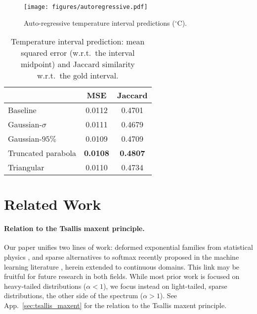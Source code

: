 \documentclass{article}
\begin{document}
{\begin{figure}[h]\centering
\texttt{[image: figures/autoregressive.pdf]}
\vspace{-0.5cm}
\caption{Auto-regressive temperature interval predictions ($^{\circ}$C).}
\end{figure}


\begin{table}[t]
    \caption{\label{tab:weather}Temperature interval prediction: mean squared error (w.r.t.\ the interval midpoint) and Jaccard similarity w.r.t.\ the gold interval.}
    \vskip 0.15in
    \begin{small}
    \begin{center}
    \begin{tabular}{lcc}
    \toprule
    & MSE & {\sc Jaccard} \\
    \midrule
    Baseline
    & 0.0112 & 0.4701 \\
    Gaussian-$\sigma$
    & 0.0111 & 0.4679 \\
    Gaussian-$95\%$
    & 0.0109 & 0.4709 \\
    Truncated parabola
    & \textbf{0.0108} & \textbf{0.4807} \\
    Triangular
    & 0.0110 & 0.4734 \\
    \bottomrule
    \end{tabular}
    \end{center}
    \end{small}
    \vskip -0.2in
\end{table}
}

\section{Related Work}\label{sec:related}
\paragraph{Relation to the Tsallis maxent principle.}
Our paper unifies two lines of work: deformed exponential families from statistical physics \citep{Tsallis1988,naudts2009q,amari2011geometry}, and sparse alternatives to softmax recently proposed in the machine learning literature \citep{Martins2016ICML,peters2019sparse,blondel2020learning}, herein extended to continuous domains. This link may be fruitful for future research in both fields. 
While most prior work is focused on heavy-tailed distributions ($\alpha < 1$), we focus instead on light-tailed, sparse distributions, the other side of the spectrum ($\alpha > 1$). See App.~\ref{sec:tsallis_maxent} for the relation to the Tsallis maxent principle.  
\end{document}
